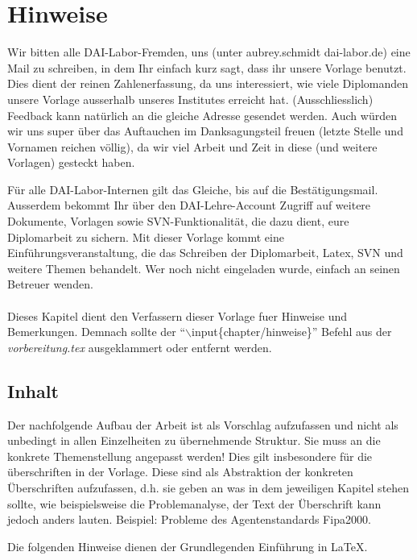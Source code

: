 \chapter*{Hinweise}
Wir bitten alle DAI-Labor-Fremden, uns (unter aubrey.schmidt dai-labor.de) eine Mail zu schreiben, in dem Ihr einfach kurz sagt, dass ihr unsere Vorlage benutzt. Dies dient der reinen Zahlenerfassung, da uns interessiert, wie viele Diplomanden unsere Vorlage ausserhalb unseres Institutes erreicht hat. (Ausschliesslich) Feedback kann natürlich an die gleiche Adresse gesendet werden. Auch würden wir uns super über das Auftauchen im Danksagungsteil freuen (letzte Stelle und Vornamen reichen völlig), da wir viel Arbeit und Zeit in diese (und weitere Vorlagen) gesteckt haben.

Für alle DAI-Labor-Internen gilt das Gleiche, bis auf die Bestätigungsmail. Ausserdem bekommt Ihr über den DAI-Lehre-Account Zugriff auf weitere Dokumente, Vorlagen sowie SVN-Funktionalität, die dazu dient, eure Diplomarbeit zu sichern. Mit dieser Vorlage kommt eine Einführungsveranstaltung, die das Schreiben der Diplomarbeit, Latex, SVN und weitere Themen behandelt. Wer noch nicht eingeladen wurde, einfach an seinen Betreuer wenden.\\\\

\noindent Dieses Kapitel dient den Verfassern dieser Vorlage fuer Hinweise und Bemerkungen. Demnach sollte der ``$\backslash$input\{chapter{\slash}hinweise\}'' Befehl aus der {\em vorbereitung.tex} ausgeklammert oder entfernt werden.
\section{Inhalt}
Der nachfolgende Aufbau der Arbeit ist als Vorschlag aufzufassen und nicht als unbedingt in allen Einzelheiten zu übernehmende Struktur. Sie muss an die konkrete Themenstellung angepasst werden! Dies gilt insbesondere für die überschriften in der Vorlage. Diese sind als Abstraktion der konkreten Überschriften aufzufassen, d.h. sie geben an was in dem jeweiligen Kapitel stehen sollte, wie beispielsweise die Problemanalyse, der Text der Überschrift kann jedoch anders lauten. Beispiel: Probleme des Agentenstandards Fipa2000.

Die folgenden Hinweise dienen der Grundlegenden Einführung in \LaTeX.

